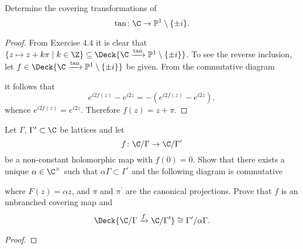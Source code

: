 \documentclass[10pt]{amsart}
\begin{document}
\begin{thm}
  Determine the covering transformations of
  $$\tan \colon \C \rightarrow \mathbb{P}^1 \setminus \{\pm i\}.$$
  
  \begin{proof}
    From Exercise 4.4 it is clear that $\left\{ z \mapsto z + k\pi \;\middle\vert\; k \in \Z \right\} \subseteq \Deck{\C \xrightarrow{\tan} \mathbb{P}^1 \setminus \{\pm i\}}$.
    To see the reverse inclusion, let $f \in \Deck{\C \xrightarrow{\tan} \mathbb{P}^1 \setminus \{\pm i\}}$ be given.
    From the commutative diagram
    \begin{center}
    \end{center}
    it follows that
    $$e^{i2f(z)} - e^{i2z} = -(e^{i2f(z)} - e^{i2z}),$$
    whence $e^{i2f(z)} = e^{i2z}$.
    Therefore $f(z) = z + \pi$.
  \end{proof}
\end{thm}

\begin{thm}
  Let $\Gamma$, $\Gamma^\prime \subset \C$ be lattices and let
  $$f \colon \C / \Gamma \rightarrow \C / \Gamma^\prime$$
  be a non-constant holomorphic map with $f(0) = 0$.
  Show that there exists a unique $\alpha \in \C^\times$ such that $\alpha\Gamma \subset \Gamma^\prime$ and the following diagram is commutative
  \begin{center}
  \end{center}
  where $F(z) = \alpha z$, and $\pi$ and $\pi^\prime$ are the canonical projections.
  Prove that $f$ is an unbranched covering map and
  $$\Deck{\C/\Gamma \xrightarrow{f} \C/\Gamma^\prime} \cong \Gamma^\prime / \alpha\Gamma.$$

  \begin{proof}
  \end{proof}
\end{thm}
\end{document}
